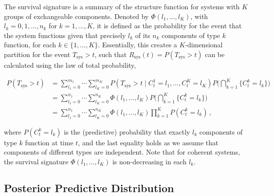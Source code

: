 \documentclass[Journal,SectionNumbers,SingleSpace,InsideFigs]{ascelike}
\newcommand{\dd}{\,\mathrm{d}}
\newcommand{\uz}{^{(0)}} %
\newcommand{\Rsys}{R_\text{sys}}
\def\Rsys{R_\text{sys}}
\def\Tsys{T_\text{sys}}
\def\ykz{y\uz_k}
\def\nkz{n\uz_k}
\begin{document}
The survival signature \cite{2012:survsign} is a summary of the structure function
for systems with $K$ groups of exchangeable components.
Denoted by $\Phi(l_1,\ldots,l_K)$, with $l_k=0,1,\ldots,n_k$ for $k=1,\ldots,K$,
it is defined as the probability for the event that the system functions
given that precisely $l_k$ of its $n_k$ components of type $k$ function, for each $k\in \{1,\ldots,K\}$.
Essentially, this creates a $K$-dimensional partition for the event $\Tsys > t$,
such that $\Rsys(t) = P(\Tsys > t)$ can be calculated using the law of total probability,
\begin{linenomath*}
\begin{align}
P(\Tsys > t) &= \sum_{l_1=0}^{m_1} \cdots \sum_{l_K=0}^{m_K} P(\Tsys > t \mid C^1_t = l_1,\ldots, C^K_t = l_K)
                                                                                  P\Big( \bigcap_{k=1}^K \{ C^k_t = l_k\} \Big) \nonumber\\
             &= \sum_{l_1=0}^{n_1} \cdots \sum_{l_K=0}^{n_K} \Phi(l_1,\ldots,l_K) P\Big( \bigcap_{k=1}^K \{ C^k_t = l_k\} \Big) \nonumber\\
             &= \sum_{l_1=0}^{n_1} \cdots \sum_{l_K=0}^{n_K} \Phi(l_1,\ldots,l_K) \prod_{k=1}^K P(C^k_t = l_k)\,,
\label{eq:sysrel-survsign}
\end{align}
\end{linenomath*}
where $P(C^k_t = l_k)$ is the (predictive) probability that exactly $l_k$ components of type $k$ function at time $t$,
and the last equality holds as we assume that components of different types are independent.
Note that for coherent systems,
the survival signature $\Phi(l_1,\ldots,l_K)$ is non-decreasing in each $l_k$.
%


\subsection{Posterior Predictive Distribution}
\label{sec:postpred}
\end{document}
